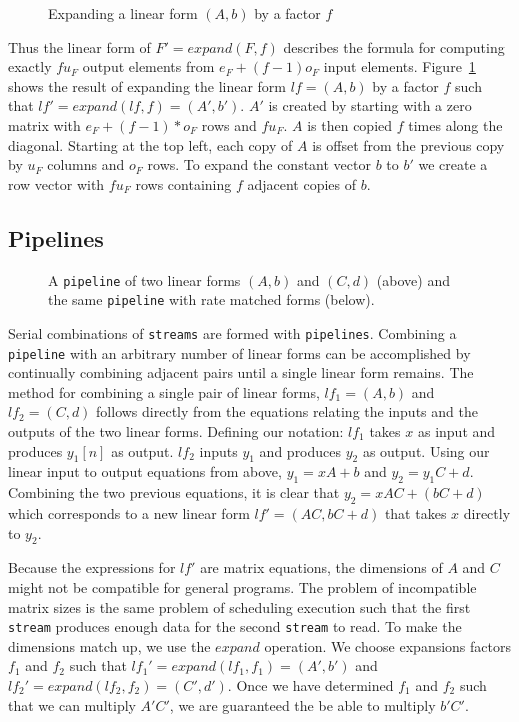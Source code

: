 \begin{figure}
\center
\epsfxsize=3.0in
\caption{Expanding a linear form $(A,b)$ by a factor $f$}
\label{fig:expanding-a-matrix}
\vspace{-12pt}
\end{figure}

Thus the linear form of $F'=expand(F, f)$ describes the formula for computing
exactly $fu_F$ output elements from $e_F + (f-1)o_F$ input elements.
Figure~\ref{fig:expanding-a-matrix} shows the result of expanding the linear 
form $lf = (A,b)$ by a factor $f$ such that $lf' = expand(lf, f) = (A',b')$. 
$A'$ is created by starting with a zero matrix with $e_F+(f-1)*o_F$ rows 
and $fu_F$. $A$ is then copied $f$ times along the
diagonal. Starting at the top left, each copy of $A$ is offset from the previous copy 
by $u_F$ columns and $o_F$ rows. To expand the constant vector $b$ to $b'$ we 
create a row vector with $fu_F$ rows containing $f$ adjacent copies of $b$.

\subsection{Pipelines}

\begin{figure}
\center
\epsfxsize=3.0in
\caption{A {\tt pipeline} of two linear forms $(A,b)$ and $(C,d)$ (above) and the same {\tt pipeline} with rate matched forms (below).}
\label{fig:combining-pipeline}
\vspace{-12pt}
\end{figure}

Serial combinations of {\tt streams} are formed with {\tt pipelines}.
Combining a {\tt pipeline} with an arbitrary number of linear forms can be accomplished 
by continually combining adjacent pairs until a single linear form remains. 
The method for combining a single pair of linear forms, $lf_1=(A,b)$ and $lf_2=(C,d)$ follows
directly from the equations relating the inputs and the outputs of the 
two linear forms. Defining our notation: $lf_1$ takes $x$ as input and produces 
$y_1[n]$ as output. $lf_2$ inputs $y_1$ and produces $y_2$ as output. 
Using our linear input to output equations from above, $y_1 = xA + b$ 
and $y_2 = y_1C + d$. Combining the two previous equations, it is clear 
that $y_2 = xAC + (bC + d)$  which corresponds to a new linear form $lf'=(AC, bC+d)$
that takes $x$ directly to $y_2$.

Because the expressions for $lf'$ are matrix equations, the dimensions of 
$A$ and $C$ might not be compatible for general programs.
The problem of incompatible matrix sizes is the same problem of scheduling execution 
such that the first {\tt stream} produces enough data for the second {\tt stream} 
to read. To make the dimensions match up, we use the $expand$ operation. We choose
expansions factors $f_1$ and $f_2$ such that $lf_1' = expand(lf_1,f_1) = (A',b')$ and 
$lf_2' = expand(lf_2,f_2) = (C',d')$. Once we have determined $f_1$ and $f_2$ such 
that we can multiply $A'C'$, we are guaranteed the be able to multiply $b'C'$.

